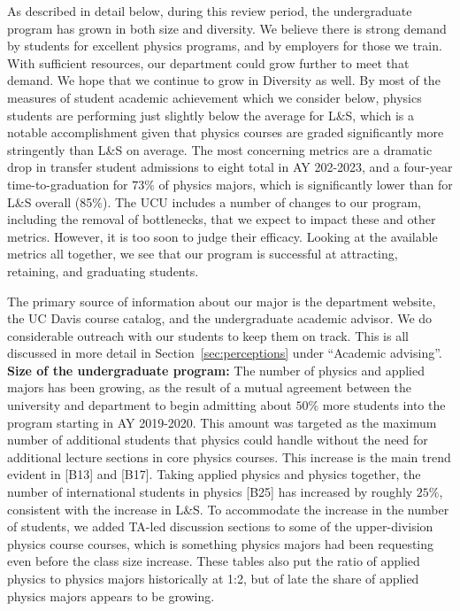\documentclass[12pt]{article}
\begin{document}
\noindent

As described in detail below, during this review period, the
undergraduate program has grown in both size and diversity.  We
believe there is strong demand by students for excellent physics
programs, and by employers for those we train.  With sufficient
resources, our department could grow further to meet that demand.  We
hope that we continue to grow in Diversity as well.  By most of the
measures of student academic achievement which we consider below,
physics students are performing just slightly below the average for
L\&S, which is a notable accomplishment given that physics courses are
graded significantly more stringently than L\&S on average.  The most
concerning metrics are a dramatic drop in transfer student admissions
to eight total in AY 202-2023, and a four-year time-to-graduation for
$73\%$ of physics majors, which is significantly lower than for L\&S
overall (85\%).  The UCU includes a number of changes to our program,
including the removal of bottlenecks, that we expect to impact these
and other metrics.  However, it is too soon to judge their efficacy.
Looking at the available metrics all together, we see that our program
is successful at attracting, retaining, and graduating students.

The primary source of information about our major is the department
website, the UC Davis course catalog, and the undergraduate academic
advisor.  We do considerable outreach with our students to keep them
on track.  This is all discussed in more detail in
Section~\ref{sec:perceptions} under ``Academic advising''.\\[3pt]

\noindent
{\bf Size of the undergraduate program:} The number of physics and
applied majors has been growing, as the result of a mutual agreement
between the university and department to begin admitting about $50\%$
more students into the program starting in AY 2019-2020.  This amount
was targeted as the maximum number of additional students that physics
could handle without the need for additional lecture sections in core
physics courses.  This increase is the main trend evident in [B13] and
[B17]. Taking applied physics and physics together, the number of
international students in physics [B25] has increased by roughly
$25\%$, consistent with the increase in L\&S.  To accommodate the
increase in the number of students, we added TA-led discussion
sections to some of the upper-division physics course courses, which
is something physics majors had been requesting even before the class
size increase.  These tables also put the ratio of applied physics to
physics majors historically at 1:2, but of late the share of applied
physics majors appears to be growing.\\[3pt]
\end{document}
